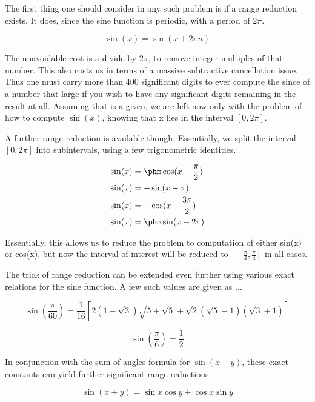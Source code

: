 \documentclass[a4paper,12pt]{article}
\begin{document}
The first thing one should consider in any such problem is if a range reduction exists. It does, since the sine function is periodic, with a period of $2\pi$.

\begin{equation}
   \sin(x) = \sin(x + 2\pi n)
\end{equation}

The unavoidable cost is a divide by $2\pi$, to remove integer multiples of that number. This also costs us in terms of a massive subtractive cancellation issue. Thus one must carry more than 400 significant digits to ever compute the since of a number that large if you wish to have any significant digits remaining in the result at all. Assuming that is a given, we are left now only with the problem of how to compute $\sin(x)$, knowing that x lies in the interval $[0,2\pi]$.

A further range reduction is available though. Essentially, we split the interval $[0,2\pi]$ into subintervals, using a few trigonometric identities.

\begin{align}
\sin(x) & = \phm\cos(x - \frac{\pi}{2})\\
\sin(x) & = -\sin(x - \pi)\\
\sin(x) & = -\cos(x - \frac{3\pi}{2})\\
\sin(x) & = \phm\sin(x - 2\pi)
\end{align}

Essentially, this allows us to reduce the problem to computation of either sin(x) or cos(x), but now the interval of interest will be reduced to $[-\frac{\pi}{4} , \frac{\pi}{4}]$ in all cases.

The trick of range reduction can be extended even further using various exact relations for the sine function. A few such values are given as $\ldots$

\begin{equation}
\sin(\frac{\pi}{60}) = \frac{1}{16}[2(1-\sqrt{3})\sqrt{5+\sqrt{5}} + \sqrt{2}(\sqrt{5} - 1)(\sqrt{3}+1)]
\end{equation}

\begin{equation}
\sin(\frac{\pi}{6}) = \frac{1}{2}
\end{equation}

In conjunction with the sum of angles formula for $\sin{(x+y)}$, these exact constants can yield further significant range reductions.

\begin{equation}
\sin{(x+y)} = \sin{x} \cos{y} + \cos{x} \sin{y}
\end{equation}
\end{document}
